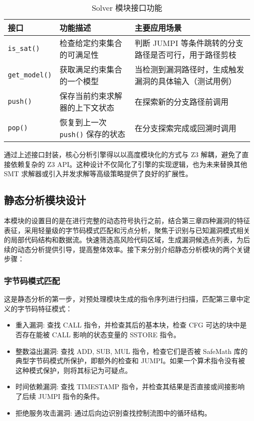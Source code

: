 \documentclass[print, master, vlined, timesmath]{DissertUESTC}
\begin{document}
\begin{table}[htbp]
    \centering
    \begin{tabularx}{\linewidth}{ll >{\RaggedRight}X}
        \toprule
        \textbf{接口} & \textbf{功能描述} & \textbf{主要应用场景} \\
        \midrule
        \texttt{is\_sat()} & 检查给定约束集合的可满足性 & 判断 JUMPI 等条件跳转的分支路径是否可行，用于路径剪枝 \\
        \addlinespace %
        \texttt{get\_model()} & 获取满足约束集合的一个模型 & 当检测到漏洞路径时，生成触发漏洞的具体输入（测试用例） \\
        \addlinespace %
        \texttt{push()} & 保存当前约束求解器的上下文状态 & 在探索新的分支路径前调用 \\
        \addlinespace %
        \texttt{pop()} & 恢复到上一次 \texttt{push()} 保存的状态 & 在分支探索完成或回溯时调用 \\
        \bottomrule
    \end{tabularx} %
    \caption{Solver 模块接口功能}
    \label{tab:solver_interface}
\end{table}


通过上述接口封装，核心分析引擎得以以高度模块化的方式与 Z3 解耦，避免了直接依赖复杂的 Z3 API。这种设计不仅简化了引擎的实现逻辑，也为未来替换其他 SMT 求解器或引入并发求解等高级策略提供了良好的扩展性。

\subsection{静态分析模块设计}

本模块的设置目的是在进行完整的动态符号执行之前，结合第三章四种漏洞的特征表征，采用轻量级的字节码模式匹配和污点分析，聚焦于识别与已知漏洞模式相关的局部代码结构和数据流。快速筛选高风险代码区域，生成漏洞候选点列表，为后续的动态分析提供引导，提高整体效率。接下来分别介绍静态分析模块的两个关键步骤：

\subsubsection{字节码模式匹配}

这是静态分析的第一步，对预处理模块生成的指令序列进行扫描，匹配第三章中定义的字节码特征模式：

\begin{itemize}
    \item 重入漏洞: 查找 CALL 指令，并检查其后的基本块，检查 CFG 可达的块中是否存在能被 CALL 影响的状态变量的 SSTORE 指令。
    \item 整数溢出漏洞: 查找 ADD, SUB, MUL 指令，检查它们是否被 SafeMath 库的典型字节码模式所保护，即额外的检查和 JUMPI。如果一个算术指令没有被这种模式保护，则将其标记为可疑点。    
    \item 时间依赖漏洞: 查找 TIMESTAMP 指令，并检查其结果是否直接或间接影响了后续 JUMPI 指令的条件。
    \item 拒绝服务攻击漏洞: 通过后向边识别查找控制流图中的循环结构。
\end{itemize}
\end{document}
